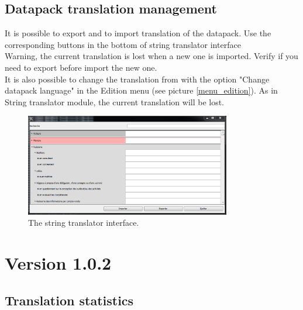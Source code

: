 \subsection{Datapack translation management}
It is possible to export and to import translation of the datapack. Use the corresponding buttons in the bottom of string translator interface \\

Warning, the current translation is lost when a new one is imported. Verify if you need to export before import the new one.\\

It is also possible to change the translation from \tria with the option "Change datapack language" in the Edition menu (see picture \ref{menu_edition}). As in String translator module, the current translation will be lost.\\

\begin{figure}[h!]
\centering

\includegraphics[width=0.8\textwidth]{../images/translator.png}
\caption{The string translator interface.}
\end{figure}



\section{Version 1.0.2}
\subsection{Translation statistics}

